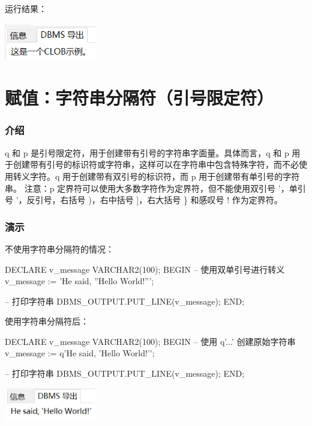 \documentclass[11pt, a4paper, oneside, UTF8]{ctexbook}
\begin{document}
运行结果：
\begin{center}
  \begin{minipage}{\textwidth}
    \center
    \includegraphics[width=0.3\textwidth]{picture/CLOB示例.png}
    \captionsetup{hypcap=false}
    \label{fig:CLOB示例}
  \end{minipage}
\end{center}
\section{赋值：字符串分隔符（引号限定符）}
\subsubsection{介绍}
q 和 p 是引号限定符，用于创建带有引号的字符串字面量。具体而言，q 和 p 用于创建带有引号的标识符或字符串，这样可以在字符串中包含特殊字符，而不必使用转义字符。q 用于创建带有双引号的标识符，而 p 用于创建带有单引号的字符串。
注意：p 定界符可以使用大多数字符作为定界符，但不能使用双引号 '，单引号 '，反引号\textasciigrave，右括号 )，右中括号 ]，右大括号 \} 和感叹号 ! 作为定界符。
\subsubsection{演示}
不使用字符串分隔符的情况：
\begin{plsql}[caption=不使用字符串分隔符]
DECLARE
  v_message VARCHAR2(100);
BEGIN
  -- 使用双单引号进行转义
  v_message := 'He said, ''Hello World!''';

  -- 打印字符串
  DBMS_OUTPUT.PUT_LINE(v_message);
END;
\end{plsql}
使用字符串分隔符后：
\begin{plsql}[caption=使用字符串分隔符]
DECLARE
  v_message VARCHAR2(100);
BEGIN
  -- 使用 q'...' 创建原始字符串
  v_message := q'{He said, 'Hello World!'}';

  -- 打印字符串
  DBMS_OUTPUT.PUT_LINE(v_message);
END;
\end{plsql}
\begin{center}
  \begin{minipage}{\textwidth}
    \center
    \includegraphics[width=0.3\textwidth]{picture/字符串分隔符效果图.png}
    \captionsetup{hypcap=false}
    \label{fig:字符串分隔符效果图}
  \end{minipage}
\end{center}
\end{document}
